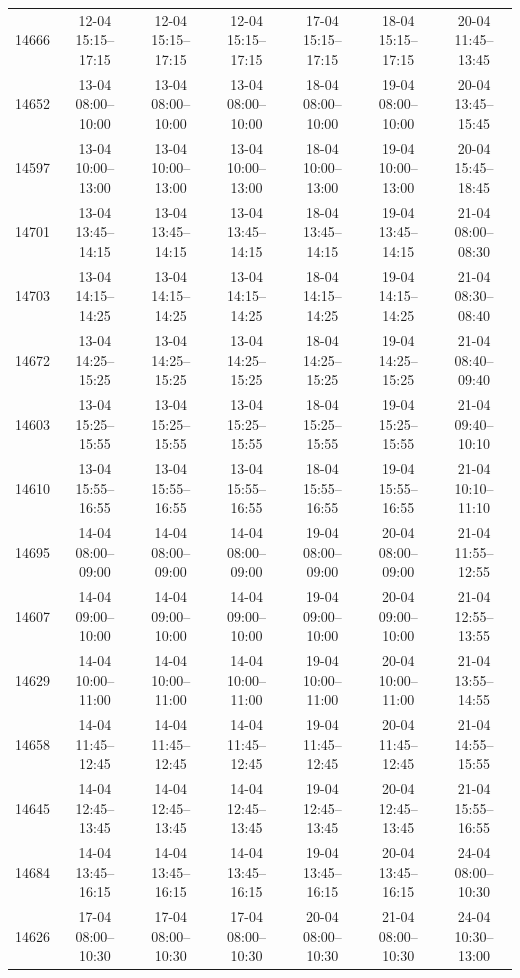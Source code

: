 \begin{table}[htbp]
\begin{tabular}{|r|c|c|c|c|c|c|}
14666 & 12-04 15:15--17:15 & 12-04 15:15--17:15 & 12-04 15:15--17:15 & 17-04 15:15--17:15 & 18-04 15:15--17:15 & 20-04 11:45--13:45 \\ 
14652 & 13-04 08:00--10:00 & 13-04 08:00--10:00 & 13-04 08:00--10:00 & 18-04 08:00--10:00 & 19-04 08:00--10:00 & 20-04 13:45--15:45 \\ 
14597 & 13-04 10:00--13:00 & 13-04 10:00--13:00 & 13-04 10:00--13:00 & 18-04 10:00--13:00 & 19-04 10:00--13:00 & 20-04 15:45--18:45 \\ 
14701 & 13-04 13:45--14:15 & 13-04 13:45--14:15 & 13-04 13:45--14:15 & 18-04 13:45--14:15 & 19-04 13:45--14:15 & 21-04 08:00--08:30 \\ 
14703 & 13-04 14:15--14:25 & 13-04 14:15--14:25 & 13-04 14:15--14:25 & 18-04 14:15--14:25 & 19-04 14:15--14:25 & 21-04 08:30--08:40 \\ 
14672 & 13-04 14:25--15:25 & 13-04 14:25--15:25 & 13-04 14:25--15:25 & 18-04 14:25--15:25 & 19-04 14:25--15:25 & 21-04 08:40--09:40 \\ 
14603 & 13-04 15:25--15:55 & 13-04 15:25--15:55 & 13-04 15:25--15:55 & 18-04 15:25--15:55 & 19-04 15:25--15:55 & 21-04 09:40--10:10 \\ 
14610 & 13-04 15:55--16:55 & 13-04 15:55--16:55 & 13-04 15:55--16:55 & 18-04 15:55--16:55 & 19-04 15:55--16:55 & 21-04 10:10--11:10 \\ 
14695 & 14-04 08:00--09:00 & 14-04 08:00--09:00 & 14-04 08:00--09:00 & 19-04 08:00--09:00 & 20-04 08:00--09:00 & 21-04 11:55--12:55 \\ 
14607 & 14-04 09:00--10:00 & 14-04 09:00--10:00 & 14-04 09:00--10:00 & 19-04 09:00--10:00 & 20-04 09:00--10:00 & 21-04 12:55--13:55 \\ 
14629 & 14-04 10:00--11:00 & 14-04 10:00--11:00 & 14-04 10:00--11:00 & 19-04 10:00--11:00 & 20-04 10:00--11:00 & 21-04 13:55--14:55 \\ 
14658 & 14-04 11:45--12:45 & 14-04 11:45--12:45 & 14-04 11:45--12:45 & 19-04 11:45--12:45 & 20-04 11:45--12:45 & 21-04 14:55--15:55 \\ 
14645 & 14-04 12:45--13:45 & 14-04 12:45--13:45 & 14-04 12:45--13:45 & 19-04 12:45--13:45 & 20-04 12:45--13:45 & 21-04 15:55--16:55 \\ 
14684 & 14-04 13:45--16:15 & 14-04 13:45--16:15 & 14-04 13:45--16:15 & 19-04 13:45--16:15 & 20-04 13:45--16:15 & 24-04 08:00--10:30 \\ 
14626 & 17-04 08:00--10:30 & 17-04 08:00--10:30 & 17-04 08:00--10:30 & 20-04 08:00--10:30 & 21-04 08:00--10:30 & 24-04 10:30--13:00 \\ 

\end{tabular}
\end{table}
